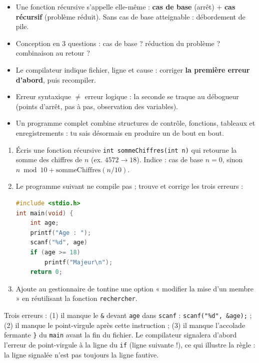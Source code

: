 \documentclass[11pt]{article}
\begin{document}
\begin{aretenir}
\begin{itemize}
\item Une fonction récursive s'appelle elle-même : \textbf{cas de base} (arrêt) + \textbf{cas récursif} (problème réduit). Sans cas de base atteignable : débordement de pile.
\item Conception en 3 questions : cas de base ? réduction du problème ? combinaison au retour ?
\item Le compilateur indique fichier, ligne et cause : corriger \textbf{la première erreur d'abord}, puis recompiler.
\item Erreur syntaxique $\neq$ erreur logique : la seconde se traque au débogueur (points d'arrêt, pas à pas, observation des variables).
\item Un programme complet combine structures de contrôle, fonctions, tableaux et enregistrements : tu sais désormais en produire un de bout en bout.
\end{itemize}
\end{aretenir}

\begin{exercice}
\begin{enumerate}
\item Écris une fonction récursive \texttt{int sommeChiffres(int n)} qui retourne la somme des chiffres de $n$ (ex. $4572 \to 18$). Indice : cas de base $n = 0$, sinon $n \bmod 10 + \text{sommeChiffres}(n / 10)$.
\item Le programme suivant ne compile pas ; trouve et corrige les trois erreurs :
\begin{lstlisting}[language=C]
#include <stdio.h>
int main(void) {
    int age;
    printf("Age : ");
    scanf("%d", age)
    if (age >= 18)
        printf("Majeur\n");
    return 0;
\end{lstlisting}
\item Ajoute au gestionnaire de tontine une option « modifier la mise d'un membre » en réutilisant la fonction \texttt{rechercher}.
\end{enumerate}
\end{exercice}

\begin{corrige}[Exercice n°2]
Trois erreurs : (1) il manque le \texttt{\&} devant \texttt{age} dans \texttt{scanf} : \texttt{scanf("\%d", \&age);} ; (2) il manque le point-virgule après cette instruction ; (3) il manque l'accolade fermante \texttt{\}} du \texttt{main} avant la fin du fichier. Le compilateur signalera d'abord l'erreur de point-virgule à la ligne du \texttt{if} (ligne suivante !), ce qui illustre la règle : la ligne signalée n'est pas toujours la ligne fautive.
\end{corrige}
\end{document}
